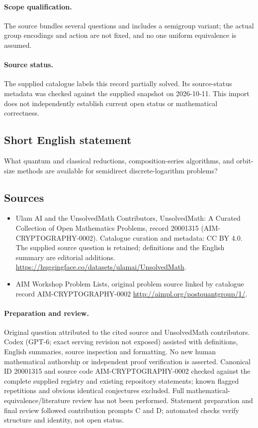 \documentclass[11pt]{article}
\begin{document}
\paragraph{Scope qualification.}
The source bundles several questions and includes a semigroup variant; the actual group encodings and action are not fixed, and no one uniform equivalence is assumed.
\paragraph{Source status.}
The supplied catalogue labels this record partially solved. Its source-status metadata was checked against the supplied snapshot on 2026-10-11. This import does not independently establish current open status or mathematical correctness.
\subsection{Short English statement}
What quantum and classical reductions, composition-series algorithms, and orbit-size methods are available for semidirect discrete-logarithm problems?
\subsection{Sources}
\begin{itemize}
\item[\hypertarget{source:20001315:1}{S1}] Ulam AI and the UnsolvedMath Contributors, UnsolvedMath: A Curated Collection of Open Mathematics Problems, record 20001315 (AIM-CRYPTOGRAPHY-0002). Catalogue curation and metadata: CC BY 4.0. The supplied source question is retained; definitions and the English summary are editorial additions.
\url{https://huggingface.co/datasets/ulamai/UnsolvedMath}.
\item[\hypertarget{source:20001315:2}{S2}] AIM Workshop Problem Lists, original problem source linked by catalogue record AIM-CRYPTOGRAPHY-0002
\url{http://aimpl.org/postquantgroup/1/}.
\end{itemize}
\paragraph{Preparation and review.}
Original question attributed to the cited source and UnsolvedMath contributors. Codex (GPT-6; exact serving revision not exposed) assisted with definitions, English summaries, source inspection and formatting. No new human mathematical authorship or independent proof verification is asserted. Canonical ID 20001315 and source code AIM-CRYPTOGRAPHY-0002 checked against the complete supplied registry and existing repository statements; known flagged repetitions and obvious identical conjectures excluded. Full mathematical-equivalence/literature review has not been performed. Statement preparation and final review followed contribution prompts C and D; automated checks verify structure and identity, not open status.
\label{end:20001315}
\end{document}
